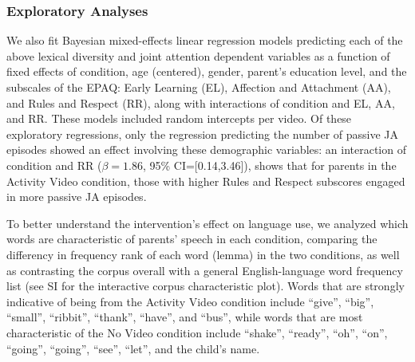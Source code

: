 \documentclass[man,floatsintext]{apa6}
\begin{document}
\hypertarget{exploratory-analyses}{%
\subsubsection{Exploratory Analyses}\label{exploratory-analyses}}

We also fit Bayesian mixed-effects linear regression models predicting each of the above lexical diversity and joint attention dependent variables as a function of fixed effects of condition, age (centered), gender, parent's education level, and the subscales of the EPAQ: Early Learning (EL), Affection and Attachment (AA), and Rules and Respect (RR), along with interactions of condition and EL, AA, and RR.
These models included random intercepts per video.
Of these exploratory regressions, only the regression predicting the number of passive JA episodes showed an effect involving these demographic variables: an interaction of condition and RR (\(\beta=1.86\), 95\% CI={[}0.14,3.46{]}), shows that for parents in the Activity Video condition, those with higher Rules and Respect subscores engaged in more passive JA episodes.

To better understand the intervention's effect on language use, we analyzed which words are characteristic of parents' speech in each condition, comparing the differency in frequency rank of each word (lemma) in the two conditions, as well as contrasting the corpus overall with a general English-language word frequency list (see SI for the interactive corpus characteristic plot).
Words that are strongly indicative of being from the Activity Video condition include \enquote{give}, \enquote{big}, \enquote{small}, \enquote{ribbit}, \enquote{thank}, \enquote{have}, and \enquote{bus}, while words that are most characteristic of the No Video condition include \enquote{shake}, \enquote{ready}, \enquote{oh}, \enquote{on}, \enquote{going}, \enquote{going}, \enquote{see}, \enquote{let}, and the child's name.
\end{document}
